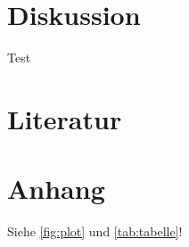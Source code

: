 
\section{Diskussion}
Test
\section{Literatur}

\section{Anhang}
Siehe \autoref{fig:plot} und \autoref{tab:tabelle}!


